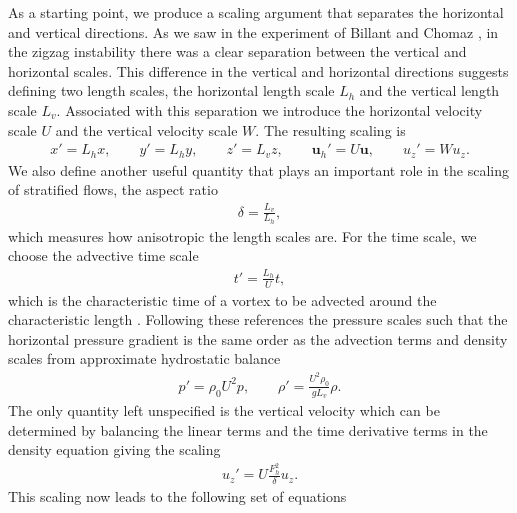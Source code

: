 As a starting point, we produce a scaling argument that separates the horizontal and vertical directions. As we saw in the experiment of Billant and Chomaz \cite{bc2000a}, in the zigzag instability there was a clear separation between the vertical and horizontal scales. This difference in the vertical and horizontal directions suggests defining two length scales, the horizontal length scale $L_{h}$ and the vertical length scale $L_{v}$. Associated with this separation we introduce the horizontal velocity scale $U$ and the vertical velocity scale $W$. The resulting scaling is
\begin{align}
x'=L_{h}x,\qquad y' =L_{h}y, \qquad z'=L_{v}z, \qquad \textbf{u}_{h}' = U\textbf{u}, \qquad u_{z}' = Wu_{z}.
\end{align}
We also define another useful quantity that plays an important role in the scaling of stratified flows, the aspect ratio
\begin{align}
\delta = \frac{L_{v}}{L_{h}},
\end{align}
which measures how anisotropic the length scales are. For the time scale, we choose the advective time scale 
\begin{align}
t' = \frac{L_{h}}{U}t,
\end{align}
which is the characteristic time of a vortex to be advected around the characteristic length \cite{rileylelong2000,bc2001,lilly1983}. Following these references the pressure scales such that the horizontal pressure gradient is the same order as the advection terms and density scales from approximate hydrostatic balance
\begin{align}
p' = \rho_{0}U^{2}p, \qquad \rho' = \frac{U^{2}\rho_{0}}{gL_{v}}\rho.
\end{align}
The only quantity left unspecified is the vertical velocity which can be determined by balancing the linear terms and the time derivative terms in the density equation \cite{bc2001,rileylelong2000} giving the scaling 
 \begin{align}
u_{z}' = U\frac{F_{h}^{2}}{\delta}u_{z}.
\end{align}
This scaling now leads to the following set of equations \cite{rileylindborg2013}
